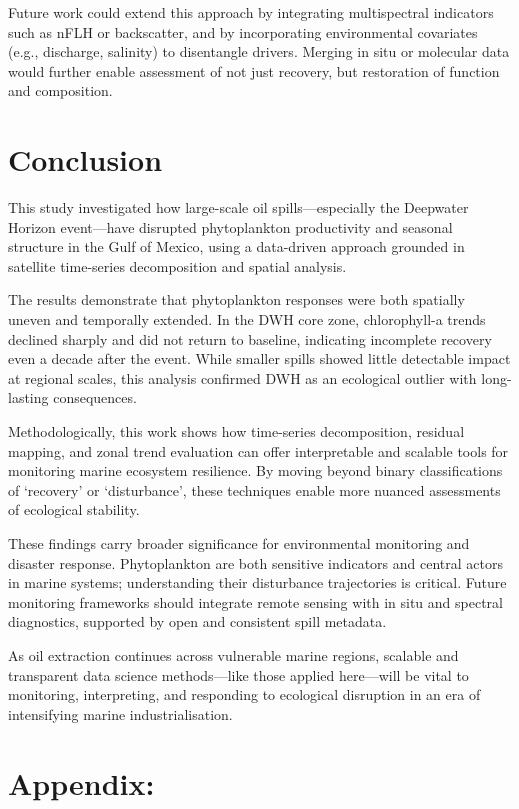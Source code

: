 \documentclass[
  11pt,
]{article}
\begin{document}
Future work could extend this approach by integrating multispectral
indicators such as nFLH or backscatter, and by incorporating
environmental covariates (e.g., discharge, salinity) to disentangle
drivers. Merging in situ or molecular data would further enable
assessment of not just recovery, but restoration of function and
composition.

\section{Conclusion}\label{conclusion}

This study investigated how large-scale oil spills---especially the
Deepwater Horizon event---have disrupted phytoplankton productivity and
seasonal structure in the Gulf of Mexico, using a data-driven approach
grounded in satellite time-series decomposition and spatial analysis.

The results demonstrate that phytoplankton responses were both spatially
uneven and temporally extended. In the DWH core zone, chlorophyll-a
trends declined sharply and did not return to baseline, indicating
incomplete recovery even a decade after the event. While smaller spills
showed little detectable impact at regional scales, this analysis
confirmed DWH as an ecological outlier with long-lasting consequences.

Methodologically, this work shows how time-series decomposition,
residual mapping, and zonal trend evaluation can offer interpretable and
scalable tools for monitoring marine ecosystem resilience. By moving
beyond binary classifications of `recovery' or `disturbance', these
techniques enable more nuanced assessments of ecological stability.

These findings carry broader significance for environmental monitoring
and disaster response. Phytoplankton are both sensitive indicators and
central actors in marine systems; understanding their disturbance
trajectories is critical. Future monitoring frameworks should integrate
remote sensing with in situ and spectral diagnostics, supported by open
and consistent spill metadata.

As oil extraction continues across vulnerable marine regions, scalable
and transparent data science methods---like those applied here---will be
vital to monitoring, interpreting, and responding to ecological
disruption in an era of intensifying marine industrialisation.

\section{Appendix:}\label{appendix}
\end{document}
